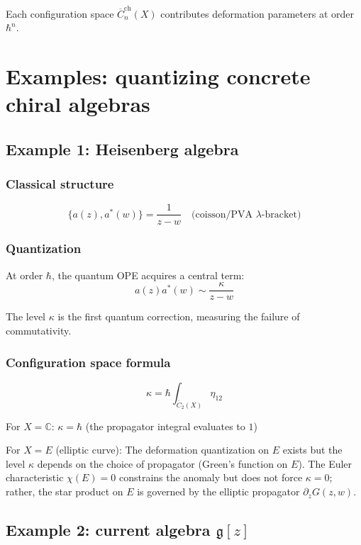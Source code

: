 Each configuration space $\overline{C}_n^{\text{ch}}(X)$ contributes deformation parameters at order $\hbar^n$.

\section{Examples: quantizing concrete chiral algebras}

\subsection{Example 1: Heisenberg algebra}

\subsubsection{Classical structure}

\[\{a(z), a^*(w)\} = \frac{1}{z-w} \quad \text{(coisson/PVA $\lambda$-bracket)}\]

\subsubsection{Quantization}

At order $\hbar$, the quantum OPE acquires a central term:
\[a(z) a^*(w) \sim \frac{\kappa}{z-w}\]

The level $\kappa$ is the first quantum correction, measuring the failure of commutativity.

\subsubsection{Configuration space formula}

\[\kappa = \hbar \int_{\overline{C}_2(X)} \eta_{12}\]

For $X = \mathbb{C}$: $\kappa = \hbar$ (the propagator integral evaluates to $1$)

For $X = E$ (elliptic curve): The deformation quantization on $E$ exists but the level $\kappa$ depends on the choice of propagator (Green's function on $E$).  The Euler characteristic $\chi(E) = 0$ constrains the anomaly but does not force $\kappa = 0$; rather, the star product on $E$ is governed by the elliptic propagator $\partial_z G(z,w)$.

\subsection{\texorpdfstring{Example 2: current algebra $\mathfrak{g}[z]$}{Example 2: current algebra g[z]}}

